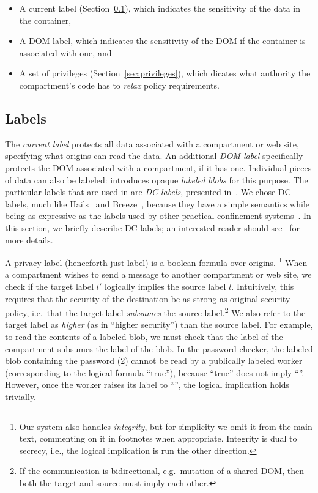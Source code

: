 \begin{itemize}
    \item A current label (Section~\ref{sec:labels}), which indicates the
        sensitivity of the data in the container,
    \item A DOM label, which indicates the sensitivity of the DOM if the
        container is associated with one, and
    \item A set of privileges (Section~\ref{sec:privileges}), which
        dicates what authority the compartment's code has to
        \emph{relax} policy requirements.
\end{itemize}

\subsection{Labels}
\label{sec:labels}

The \emph{current label} protects all data associated with a compartment or
web site, specifying what origins can read the data.
%
An additional \emph{DOM label} specifically protects the DOM associated
with a compartment, if it has one.
%
Individual pieces of data can also be labeled: \sys{}
introduces opaque \emph{labeled blobs} for this purpose.
%
The particular labels that are used in \sys{} are \emph{DC labels},
presented in~\cite{stefan:2011:dclabels}.
%
We chose DC labels, much like Hails~\cite{giffin:2012:hails} and
Breeze~\cite{Breeze13}, because they have a simple
semantics while being as expressive as the labels used by other practical
confinement systems~\cite{GenLabels}.
%
In this section, we briefly describe DC labels; an interested
reader should see~\cite{stefan:2011:dclabels} for more details.

A privacy label (henceforth just label) is a boolean formula over
origins.%
%
\footnote{
  Our system also handles \emph{integrity}, but for simplicity we
  omit it from the main text, commenting on it in footnotes when
  appropriate.  Integrity is dual to secrecy, i.e., the logical
  implication is run the other direction.
}
%
When a compartment wishes to send a message to another compartment or
web site, we check if the target label $l'$ logically implies the source
label $l$.
%
Intuitively, this requires that the security of the destination be as strong as original security policy, i.e.\ that the target label \emph{subsumes} the source label.\footnote{If the communication is bidirectional, e.g.\ mutation of a shared DOM, then both the target and source must imply each other.}
%
We also refer to the target label as \emph{higher} (as in ``higher security'') than the source label.
%
For example, to read the contents of a labeled blob, we must check that
the label of the compartment subsumes the label of the blob.
%
In the password checker, the labeled blob containing the password (2)
cannot be read by a publically labeled worker (corresponding to the
logical formula ``true''), because ``true'' does not imply
``''.
%
However, once the worker raises its label to ``'', the
logical implication holds trivially.

